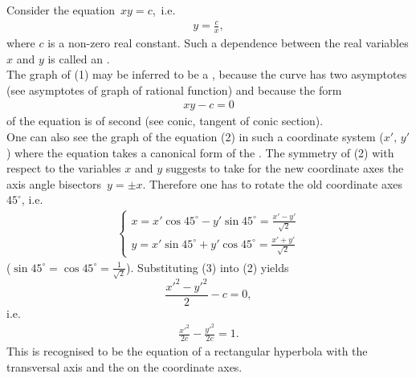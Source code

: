 \documentclass[12pt]{article}
\theoremstyle{definition}
\begin{document}
Consider the equation \,$xy = c$,\, i.e.
\begin{align}
    y = \frac{c}{x},
\end{align}
where $c$ is a non-zero real constant.  Such a dependence between the real variables $x$ and $y$ is called an .\\  

The graph of (1) may be inferred to be a , because the curve has two asymptotes (see asymptotes of graph of rational function) and because the form 
\begin{align}
    xy-c = 0
\end{align}
of the equation is of second  (see conic, tangent of conic section).\\

One can also see the graph of the equation (2) in such a coordinate system ($x',\,y'$) where the equation takes a canonical form of the .  The symmetry of (2) with respect to the variables $x$ and $y$ suggests to take for the new coordinate axes the axis angle bisectors\, $y = \pm{x}$.  Therefore one has to rotate the old coordinate axes $45^\circ$, i.e.
\begin{align}
\begin{cases}
\displaystyle x = x'\cos45^\circ-y'\sin45^\circ = \frac{x'-y'}{\sqrt{2}}\\
\displaystyle y = x'\sin45^\circ+y'\cos45^\circ = \frac{x'+y'}{\sqrt{2}}
\end{cases}
\end{align}
($\sin45^\circ = \cos45^\circ = \frac{1}{\sqrt{2}}$).  Substituting (3) into (2) yields
$$\frac{x'^2-y'^2}{2}-c = 0,$$
i.e.
\begin{align}
   \frac{x'^2}{2c}-\frac{y'^2}{2c} = 1.
\end{align}
This is recognised to be the equation of a rectangular hyperbola with the transversal axis and the  on the coordinate axes.
\end{document}
